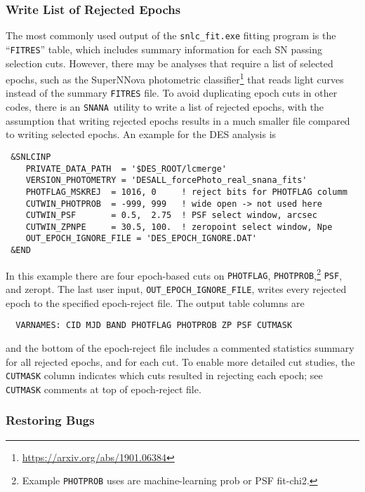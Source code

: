 \documentclass[12pt]{article}
\newcommand{\snana}{{\tt SNANA}}
\begin{document}
{%
  \subsubsection{Write List of Rejected Epochs}
  \label{sss:write_epoch_list}

The most commonly used output of the {\tt snlc\_fit.exe} fitting
program is the ``{\tt FITRES}'' table, which includes summary
information for each SN passing selection cuts. However, there
may be analyses that require a list of selected epochs, such
as the SuperNNova photometric 
classifier\footnote{\url{https://arxiv.org/abs/1901.06384}}
that reads light curves instead of the summary {\tt FITRES} file.
To avoid duplicating epoch cuts in other codes, there is an
\snana\ utility to write a list of rejected epochs,
with the assumption that writing rejected epochs results in a 
much smaller file compared to writing selected epochs.
An example for the DES analysis is
%
\begin{verbatim}
 &SNLCINP
    PRIVATE_DATA_PATH  = '$DES_ROOT/lcmerge'
    VERSION_PHOTOMETRY = 'DESALL_forcePhoto_real_snana_fits'
    PHOTFLAG_MSKREJ  = 1016, 0     ! reject bits for PHOTFLAG columm
    CUTWIN_PHOTPROB  = -999, 999   ! wide open -> not used here
    CUTWIN_PSF       = 0.5,  2.75  ! PSF select window, arcsec
    CUTWIN_ZPNPE     = 30.5, 100.  ! zeropoint select window, Npe
    OUT_EPOCH_IGNORE_FILE = 'DES_EPOCH_IGNORE.DAT'
 &END
\end{verbatim}
%
In this example there are four epoch-based cuts on 
{\tt PHOTFLAG}, 
{\tt PHOTPROB},\footnote{Example {\tt PHOTPROB} uses are
machine-learning prob or PSF fit-chi2.}
{\tt PSF}, and zeropt. 
The last user input, {\tt OUT\_EPOCH\_IGNORE\_FILE}, 
writes every rejected epoch to the specified epoch-reject file. 
The output table columns are
\begin{verbatim}
  VARNAMES: CID MJD BAND PHOTFLAG PHOTPROB ZP PSF CUTMASK
\end{verbatim} 
and the bottom of the epoch-reject file includes a commented
statistics summary for all rejected epochs, and for each cut.
To enable more detailed cut studies, the {\tt CUTMASK} column 
indicates which cuts resulted in rejecting each epoch; 
see {\tt CUTMASK} comments at top of epoch-reject file.

  \subsubsection{Restoring Bugs}
  \label{sss:restore_bugs}

}
\end{document}
